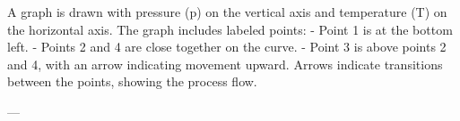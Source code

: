 A graph is drawn with pressure (p) on the vertical axis and temperature (T) on the horizontal axis. The graph includes labeled points:  
- Point 1 is at the bottom left.  
- Points 2 and 4 are close together on the curve.  
- Point 3 is above points 2 and 4, with an arrow indicating movement upward.  
Arrows indicate transitions between the points, showing the process flow.

---